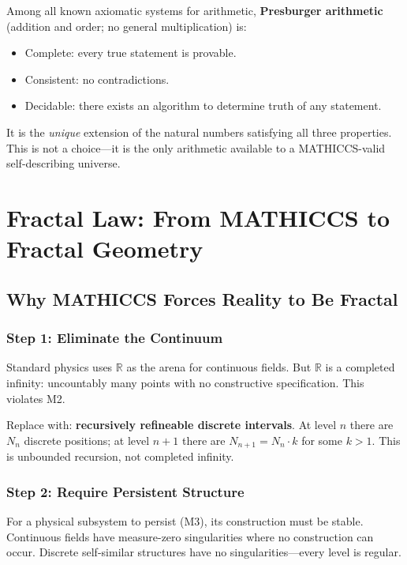 \documentclass[11pt,a4paper]{article}
\begin{document}
Among all known axiomatic systems for arithmetic, \textbf{Presburger arithmetic}
(addition and order; no general multiplication) is:
\begin{itemize}
  \item Complete: every true statement is provable.
  \item Consistent: no contradictions.
  \item Decidable: there exists an algorithm to determine truth of any statement.
\end{itemize}

It is the \emph{unique} extension of the natural numbers satisfying all three
properties. This is not a choice---it is the only arithmetic available to a
MATHICCS-valid self-describing universe.

\section{Fractal Law: From MATHICCS to Fractal Geometry}

\subsection{Why MATHICCS Forces Reality to Be Fractal}

\subsubsection{Step 1: Eliminate the Continuum}
Standard physics uses $\mathbb{R}$ as the arena for continuous fields. But
$\mathbb{R}$ is a completed infinity: uncountably many points with no constructive
specification. This violates M2.

Replace with: \textbf{recursively refineable discrete intervals}. At level $n$
there are $N_n$ discrete positions; at level $n+1$ there are $N_{n+1} = N_n
\cdot k$ for some $k > 1$. This is unbounded recursion, not completed infinity.

\subsubsection{Step 2: Require Persistent Structure}
For a physical subsystem to persist (M3), its construction must be stable.
Continuous fields have measure-zero singularities where no construction can occur.
Discrete self-similar structures have no singularities---every level is regular.
\end{document}
